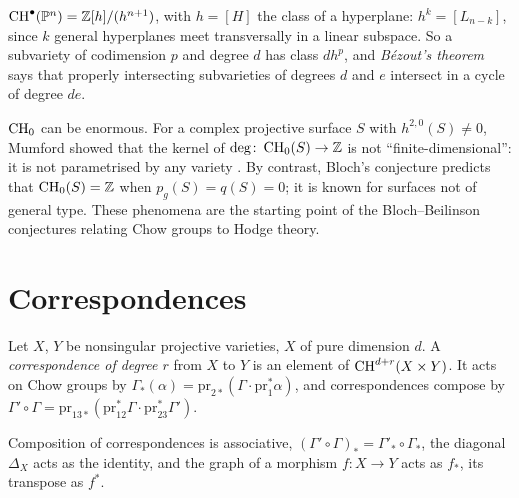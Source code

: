 \begin{example}\label{intersection-theory:example-chow-ring-projective}
$\operatorname{CH}^\bullet(\mathbb{P}^n) = \mathbb{Z}[h]/(h^{n+1})$, with $h = [H]$ the class of a hyperplane: $h^k = [L_{n-k}]$, since $k$ general hyperplanes meet transversally in a linear subspace. So a subvariety of
codimension $p$ and degree $d$ has class $dh^p$, and \emph{B\'ezout's theorem} says that properly intersecting subvarieties of degrees $d$ and $e$ intersect in a cycle of degree $de$.
\end{example}

\begin{example}\label{intersection-theory:example-chow-zero-surfaces}
$\operatorname{CH}_0$ can be enormous. For a complex projective surface $S$ with $h^{2,0}(S) \neq 0$, Mumford showed that the kernel of $\deg \colon \operatorname{CH}_0(S) \to \mathbb{Z}$ is not ``finite-dimensional'':
it is not parametrised by any variety \cite{mumford-1968}. By contrast, Bloch's conjecture predicts that $\operatorname{CH}_0(S) = \mathbb{Z}$ when $p_g(S) = q(S) = 0$; it is known for surfaces not of
general type. These phenomena are the starting point of the Bloch--Beilinson conjectures relating Chow groups to Hodge theory.
\end{example}

\section{Correspondences}\label{intersection-theory:section-correspondences}

\begin{definition}\label{intersection-theory:definition-correspondence}
Let $X$, $Y$ be nonsingular projective varieties, $X$ of pure dimension $d$. A \emph{correspondence of degree $r$} from $X$ to $Y$ is an element of $\operatorname{CH}^{d+r}(X \times Y)$. It acts on
Chow groups by $\Gamma_*(\alpha) = \mathrm{pr}_{2*}(\Gamma \cdot \mathrm{pr}_1^*\alpha)$, and correspondences compose by
$\Gamma' \circ \Gamma = \mathrm{pr}_{13*}(\mathrm{pr}_{12}^*\Gamma \cdot \mathrm{pr}_{23}^*\Gamma')$.
\end{definition}

\begin{proposition}\label{intersection-theory:proposition-correspondences}
Composition of correspondences is associative, $(\Gamma' \circ \Gamma)_* = \Gamma'_* \circ \Gamma_*$, the diagonal $\Delta_X$ acts as the identity, and the graph of a morphism
$f \colon X \to Y$ acts as $f_*$, its transpose as $f^*$.
\end{proposition}

